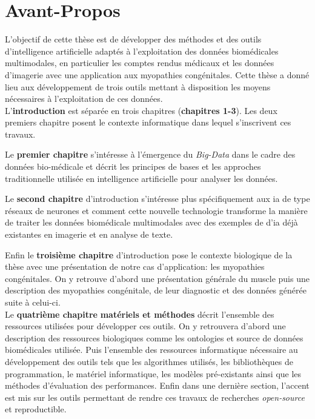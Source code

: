 \chapter{Avant-Propos}
L'objectif de cette thèse est de développer des méthodes et des outils d'intelligence artificielle adaptés à l'exploitation des données biomédicales multimodales, en particulier les comptes rendus médicaux et les données d'imagerie avec une application aux myopathies congénitales. Cette thèse a donné lieu aux développement de trois outils mettant à disposition les moyens nécessaires à l'exploitation de ces données. \\


L'\textbf{introduction} est séparée en trois chapitres (\textbf{chapitres 1-3}). Les deux premiers chapitre posent le contexte informatique dans lequel s'inscrivent ces travaux. 

Le \textbf{premier chapitre} s'intéresse à l'émergence du \textit{Big-Data} dans le cadre des données bio-médicale et décrit les principes de bases et les approches traditionnelle utilisée en intelligence artificielle pour analyser les données.

Le \textbf{second chapitre} d'introduction s'intéresse plus spécifiquement aux \gls{ia} de type réseaux de neurones et comment cette nouvelle technologie transforme la manière de traiter les données biomédicale multimodales avec des exemples de d'\gls{ia} déjà existantes en imagerie et en analyse de texte.

Enfin le \textbf{troisième chapitre} d'introduction pose le contexte biologique de la thèse avec une présentation de notre cas d'application: les myopathies congénitales. On y retrouve d'abord une présentation générale du muscle puis une description des myopathies congénitale, de leur diagnostic et des données générée suite à celui-ci. \\


Le \textbf{quatrième chapitre} \textbf{matériels et méthodes} décrit l'ensemble des ressources utilisées pour développer ces outils. On y retrouvera d'abord une description des ressources biologiques comme les ontologies et source de données biomédicales utilisée. Puis l'ensemble des ressources informatique nécessaire au développement des outils tels que les algorithmes utilisés, les bibliothèques de programmation, le matériel informatique, les modèles pré-existants ainsi que les méthodes d'évaluation des performances. Enfin dans une dernière section, l'accent est mis sur les outils permettant de rendre ces travaux de recherches \textit{open-source} et reproductible. \\


